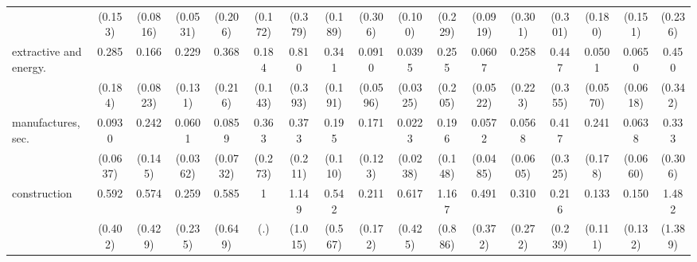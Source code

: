{\begin{tabular}{l*{16}{c}}
                    &     (0.153)         &    (0.0816)         &    (0.0531)         &     (0.206)         &     (0.172)         &     (0.379)         &     (0.189)         &     (0.306)         &     (0.100)         &     (0.229)         &    (0.0919)         &     (0.301)         &     (0.301)         &     (0.180)         &     (0.151)         &     (0.236)         \\
[1em]
extractive and energy.&       0.285         &       0.166\sym{***}&       0.229\sym{**} &       0.368         &       0.184\sym{*}  &       0.810         &       0.341         &      0.0910\sym{***}&      0.0395\sym{***}&       0.255         &      0.0607\sym{**} &       0.258         &       0.447         &      0.0501\sym{**} &      0.0650\sym{**} &       0.450         \\
                    &     (0.184)         &    (0.0823)         &     (0.131)         &     (0.216)         &     (0.143)         &     (0.393)         &     (0.191)         &    (0.0596)         &    (0.0325)         &     (0.205)         &    (0.0522)         &     (0.223)         &     (0.355)         &    (0.0570)         &    (0.0618)         &     (0.342)         \\
[1em]
manufactures, sec.  &      0.0930\sym{***}&       0.242\sym{*}  &      0.0601\sym{***}&      0.0859\sym{**} &       0.363         &       0.373         &       0.195\sym{**} &       0.171\sym{*}  &      0.0223\sym{***}&       0.196\sym{*}  &      0.0572\sym{***}&      0.0568\sym{**} &       0.417         &       0.241         &      0.0638\sym{**} &       0.333         \\
                    &    (0.0637)         &     (0.145)         &    (0.0362)         &    (0.0732)         &     (0.273)         &     (0.211)         &     (0.110)         &     (0.123)         &    (0.0238)         &     (0.148)         &    (0.0485)         &    (0.0605)         &     (0.325)         &     (0.178)         &    (0.0660)         &     (0.306)         \\
[1em]
construction        &       0.592         &       0.574         &       0.259         &       0.585         &           1         &       1.149         &       0.542         &       0.211         &       0.617         &       1.167         &       0.491         &       0.310         &       0.216         &       0.133\sym{*}  &       0.150\sym{*}  &       1.482         \\
                    &     (0.402)         &     (0.429)         &     (0.235)         &     (0.649)         &         (.)         &     (1.015)         &     (0.567)         &     (0.172)         &     (0.425)         &     (0.886)         &     (0.372)         &     (0.272)         &     (0.239)         &     (0.111)         &     (0.132)         &     (1.389)         \\

\end{tabular}}
